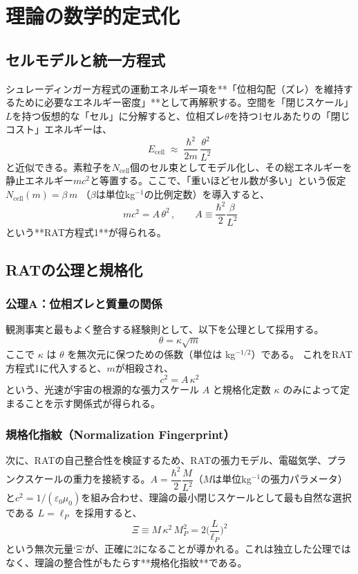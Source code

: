 \documentclass[11pt,a4paper,ja=standard]{ltjarticle}
\newcommand{\kappaR}{\kappa}
\newcommand{\betaC}{\beta}
\begin{document}
\section{理論の数学的定式化}
\subsection{セルモデルと統一方程式}
シュレーディンガー方程式の運動エネルギー項を**「位相勾配（ズレ）を維持するために必要なエネルギー密度」**として再解釈する。空間を「閉じスケール」$L$を持つ仮想的な「セル」に分解すると、位相ズレ$\theta$を持つ1セルあたりの「閉じコスト」エネルギーは、
\[ E_{\text{cell}}\;\approx\;\frac{\hbar^2}{2m}\,\frac{\theta^2}{L^2} \]
と近似できる。素粒子を$N_{\text{cell}}$個のセル束としてモデル化し、その総エネルギーを静止エネルギー$mc^2$と等置する。ここで、「重いほどセル数が多い」という仮定 $N_{\text{cell}}(m) = \betaC\, m$ （$\betaC$は単位kg$^{-1}$の比例定数）を導入すると、
\begin{equation}
    \boxed{\,m c^2 = A\,\theta^2\,},\qquad A \equiv \frac{\hbar^2}{2}\frac{\betaC}{L^2}
\end{equation}
という**RAT方程式1**が得られる。
\subsection{RATの公理と規格化}
\subsubsection*{公理A：位相ズレと質量の関係}
観測事実と最もよく整合する経験則として、以下を公理として採用する。
\begin{equation}
    \theta = \kappaR\sqrt{m}
\end{equation}
ここで $\kappaR$ は $\theta$ を無次元に保つための係数（単位は kg$^{-1/2}$）である。
これをRAT方程式1に代入すると、$m$が相殺され、
\begin{equation}
    \boxed{\,c^2 = A\,\kappaR^2\,}
\end{equation}
という、光速が宇宙の根源的な張力スケール $A$ と規格化定数 $\kappaR$ のみによって定まることを示す関係式が得られる。
\subsubsection*{規格化指紋（Normalization Fingerprint）}
次に、RATの自己整合性を検証するため、RATの張力モデル、電磁気学、プランクスケールの重力を接続する。$A=\dfrac{\hbar^2}{2}\dfrac{M}{L^2}$（$M$は単位kg$^{-1}$の張力パラメータ）と$c^2=1/(\varepsilon_0 \mu_0)$を組み合わせ、理論の最小閉じスケールとして最も自然な選択である $L=\ell_P$ を採用すると、
\begin{equation}
    \boxed{\,\Xi \equiv M\,\kappaR^2\,M_P^2 = 2\Big(\frac{L}{\ell_P}\Big)^2\,}
\end{equation}
という無次元量`Ξ`が、正確に2になることが導かれる。これは独立した公理ではなく、理論の整合性がもたらす**規格化指紋**である。
\end{document}
